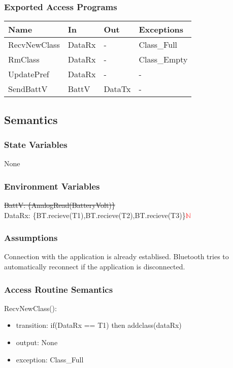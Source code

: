 \documentclass[12pt, titlepage]{article}
\begin{document}
\subsubsection{Exported Access Programs}

\begin{center}
\begin{tabular}{p{3cm} p{4cm} p{3cm} p{3cm}}
\hline
\textbf{Name} & \textbf{In} & \textbf{Out} & \textbf{Exceptions} \\
\hline
RecvNewClass & DataRx & - & Class\_Full \\
\hline
RmClass & DataRx & - & Class\_Empty \\
\hline
UpdatePref & DataRx & - & - \\
\hline
SendBattV & BattV & DataTx & - \\
\hline

\end{tabular}
\end{center}

\subsection{Semantics}

\subsubsection{State Variables}

None
\subsubsection{Environment Variables}

\sout{BattV: \{AnalogRead(BatteryVolt)\}}\\ 
DataRx: \{BT.recieve(T1),BT.recieve(T2),BT.recieve(T3)\}\textcolor{red}{$\mathbb{N}$}

\subsubsection{Assumptions}

Connection with the application is already establised. Bluetooth tries to automatically reconnect if the application is disconnected. 

\subsubsection{Access Routine Semantics}

\noindent RecvNewClass():
\begin{itemize}
\item transition: if(DataRx == T1) then addclass(dataRx) 
\item output: None 
\item exception: Class\_Full
\end{itemize}
\end{document}
